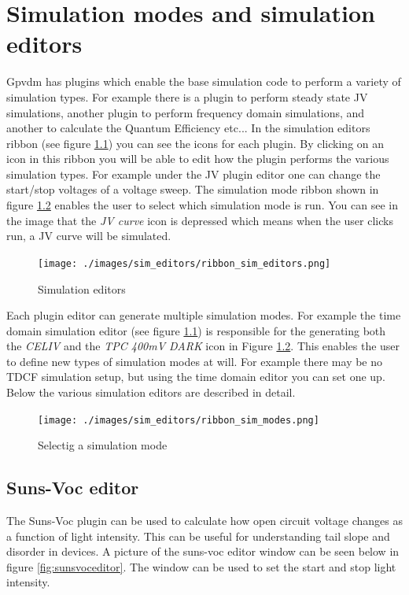 \chapter{Simulation modes and simulation editors}
\label{sec:simmodes}

Gpvdm has  plugins which enable the base simulation code to perform a variety of simulation types. For example there is a plugin to perform steady state JV simulations, another plugin to perform frequency domain simulations, and another to calculate the Quantum Efficiency etc... In the simulation editors ribbon (see figure \ref{fig:simeditors}) you can see the icons for each plugin. By clicking on an icon in this ribbon you will be able to edit how the plugin performs the various simulation types.  For example under the JV plugin editor one can change the start/stop voltages of a voltage sweep.  The simulation mode ribbon shown in figure \ref{fig:simmodes} enables the user to select which simulation mode is run.  You can see in the image that the \emph{JV curve} icon is depressed which means when the user clicks run, a JV curve will be simulated.

\begin{figure}[H]
\centering
\texttt{[image: ./images/sim\_editors/ribbon\_sim\_editors.png]}
\caption{Simulation editors}
\label{fig:simeditors}
\end{figure}

Each plugin editor can generate multiple simulation modes.  For example the time domain simulation editor (see figure \ref{fig:simeditors}) is responsible for the generating both the \emph{CELIV} and the \emph{TPC 400mV DARK} icon in Figure \ref{fig:simmodes}. This enables the user to define new types of simulation modes at will.  For example there may be no TDCF simulation setup, but using the time domain editor you can set one up.  Below the various simulation editors are described in detail.

\begin{figure}[H]
\centering
\texttt{[image: ./images/sim\_editors/ribbon\_sim\_modes.png]}
\caption{Selectig a simulation mode}
\label{fig:simmodes}
\end{figure}




\section{Suns-Voc editor}
The Suns-Voc plugin can be used to calculate how open circuit voltage changes as a function of light intensity.  This can be useful for understanding tail slope and disorder in devices.  A picture of the suns-voc editor window can be seen below in figure \ref{fig:sunsvoceditor}.  The window can be used to set the start and stop light intensity.

